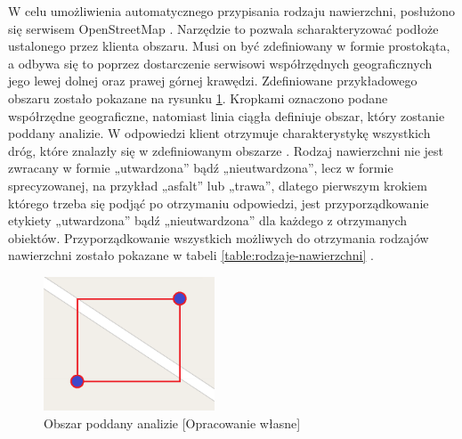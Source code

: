 W celu umożliwienia automatycznego przypisania rodzaju nawierzchni, posłużono się serwisem OpenStreetMap \cite{osm}. Narzędzie to pozwala scharakteryzować podłoże ustalonego przez klienta obszaru. Musi on być zdefiniowany w formie prostokąta, a odbywa się to poprzez dostarczenie serwisowi współrzędnych geograficznych jego lewej dolnej oraz prawej górnej krawędzi. Zdefiniowane przykładowego obszaru zostało pokazane na rysunku \ref{image:mapka_obszar}. Kropkami oznaczono podane współrzędne geograficzne, natomiast linia ciągła definiuje obszar, który zostanie poddany analizie. W odpowiedzi klient otrzymuje charakterystykę wszystkich dróg, które znalazły się w zdefiniowanym obszarze \cite{osm-docs-wiki}. Rodzaj nawierzchni nie jest zwracany w formie „utwardzona” bądź „nieutwardzona”, lecz w formie sprecyzowanej, na przykład „asfalt” lub „trawa”, dlatego pierwszym krokiem którego trzeba się podjąć po otrzymaniu odpowiedzi, jest przyporządkowanie etykiety  „utwardzona” bądź „nieutwardzona” dla każdego z otrzymanych obiektów. Przyporządkowanie wszystkich możliwych do otrzymania rodzajów nawierzchni zostało pokazane w tabeli \ref{table:rodzaje-nawierzchni} \cite{osm-surface}.

\begin{figure}[h]\label{fig:miary}
\begin{center}
\includegraphics[width=2in]{img/mapka_obszar.png}
\caption{Obszar poddany analizie [Opracowanie własne]}\label{image:mapka_obszar}
\end{center}
\end{figure}

